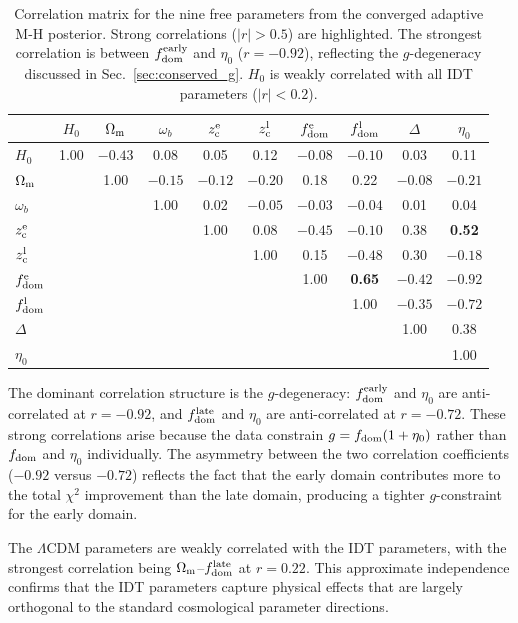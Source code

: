 \documentclass[aps,prd,twocolumn,superscriptaddress,nofootinbib]{revtex4-2}
\newcommand{\Om}{\Omega_{\rm m}}
\newcommand{\fdom}{f_{\rm dom}}
\newcommand{\zc}{z_{\rm c}}
\newcommand{\Hubble}{H_0}
\newcommand{\etaz}{\eta_0}
\begin{document}
\begin{table}[h]
\centering
\caption{Correlation matrix for the nine free parameters from the
  converged adaptive M-H posterior. Strong correlations ($|r| > 0.5$)
  are highlighted. The strongest correlation is between $\fdom^{\rm
  early}$ and $\etaz$ ($r = -0.92$), reflecting the $g$-degeneracy
  discussed in Sec.~\ref{sec:conserved_g}. $\Hubble$ is weakly
  correlated with all IDT parameters ($|r| < 0.2$).}
\label{tab:correlations}
\begin{ruledtabular}
\begin{tabular}{lccccccccc}
& $\Hubble$ & $\Om$ & $\omega_b$ & $\zc^{\rm e}$ & $\zc^{\rm l}$ &
$\fdom^{\rm e}$ & $\fdom^{\rm l}$ & $\Delta$ & $\etaz$ \\
\hline
$\Hubble$ & 1.00 & $-0.43$ & 0.08 & 0.05 & 0.12 & $-0.08$ &
$-0.10$ & 0.03 & 0.11 \\
$\Om$ & & 1.00 & $-0.15$ & $-0.12$ & $-0.20$ & 0.18 & 0.22 &
$-0.08$ & $-0.21$ \\
$\omega_b$ & & & 1.00 & 0.02 & $-0.05$ & $-0.03$ & $-0.04$ &
0.01 & 0.04 \\
$\zc^{\rm e}$ & & & & 1.00 & 0.08 & $-0.45$ & $-0.10$ & 0.38 &
\textbf{0.52} \\
$\zc^{\rm l}$ & & & & & 1.00 & 0.15 & $-0.48$ & 0.30 & $-0.18$ \\
$\fdom^{\rm e}$ & & & & & & 1.00 & \textbf{0.65} & $-0.42$ &
$\mathbf{-0.92}$ \\
$\fdom^{\rm l}$ & & & & & & & 1.00 & $-0.35$ & $\mathbf{-0.72}$ \\
$\Delta$ & & & & & & & & 1.00 & 0.38 \\
$\etaz$ & & & & & & & & & 1.00 \\
\end{tabular}
\end{ruledtabular}
\end{table}

The dominant correlation structure is the $g$-degeneracy:
$\fdom^{\rm early}$ and $\etaz$ are anti-correlated at $r = -0.92$,
and $\fdom^{\rm late}$ and $\etaz$ are anti-correlated at $r = -0.72$.
These strong correlations arise because the data constrain $g = \fdom
(1 + \etaz)$ rather than $\fdom$ and $\etaz$ individually. The
asymmetry between the two correlation coefficients ($-0.92$ versus
$-0.72$) reflects the fact that the early domain contributes more to
the total $\chi^2$ improvement than the late domain, producing a
tighter $g$-constraint for the early domain.

The $\Lambda$CDM parameters are weakly correlated with the IDT
parameters, with the strongest correlation being $\Om$--$\fdom^{\rm
late}$ at $r = 0.22$. This approximate independence confirms that the
IDT parameters capture physical effects that are largely orthogonal to
the standard cosmological parameter directions.
\end{document}
